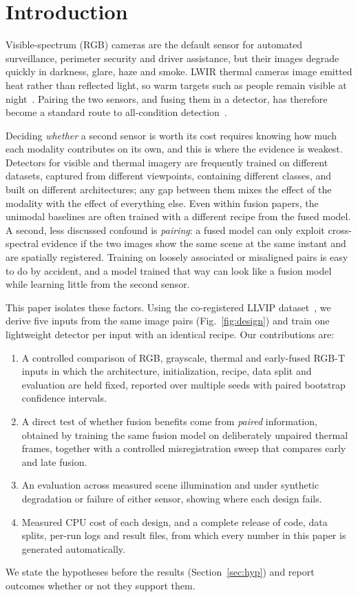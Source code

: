 \documentclass[conference]{IEEEtran}
\begin{document}
\section{Introduction}
Visible-spectrum (RGB) cameras are the default sensor for automated surveillance, perimeter security and driver assistance, but their images degrade quickly in darkness, glare, haze and smoke. LWIR thermal cameras image emitted heat rather than reflected light, so warm targets such as people remain visible at night~\cite{gade2014thermal,davis2005thermal}. Pairing the two sensors, and fusing them in a detector, has therefore become a standard route to all-condition detection~\cite{hwang2015kaist,liu2016multispectral,wagner2016fusion}.

Deciding \emph{whether} a second sensor is worth its cost requires knowing how much each modality contributes on its own, and this is where the evidence is weakest. Detectors for visible and thermal imagery are frequently trained on different datasets, captured from different viewpoints, containing different classes, and built on different architectures; any gap between them mixes the effect of the modality with the effect of everything else. Even within fusion papers, the unimodal baselines are often trained with a different recipe from the fused model. A second, less discussed confound is \emph{pairing}: a fused model can only exploit cross-spectral evidence if the two images show the same scene at the same instant and are spatially registered. Training on loosely associated or misaligned pairs is easy to do by accident, and a model trained that way can look like a fusion model while learning little from the second sensor.

This paper isolates these factors. Using the co-registered LLVIP dataset~\cite{jia2021llvip}, we derive five inputs from the same image pairs (Fig.~\ref{fig:design}) and train one lightweight detector per input with an identical recipe. Our contributions are:
\begin{enumerate}
\item A controlled comparison of RGB, grayscale, thermal and early-fused RGB-T inputs in which the architecture, initialization, recipe, data split and evaluation are held fixed, reported over multiple seeds with paired bootstrap confidence intervals.
\item A direct test of whether fusion benefits come from \emph{paired} information, obtained by training the same fusion model on deliberately unpaired thermal frames, together with a controlled misregistration sweep that compares early and late fusion.
\item An evaluation across measured scene illumination and under synthetic degradation or failure of either sensor, showing where each design fails.
\item Measured CPU cost of each design, and a complete release of code, data splits, per-run logs and result files, from which every number in this paper is generated automatically.
\end{enumerate}
We state the hypotheses before the results (Section~\ref{sec:hyp}) and report outcomes whether or not they support them.
\end{document}
